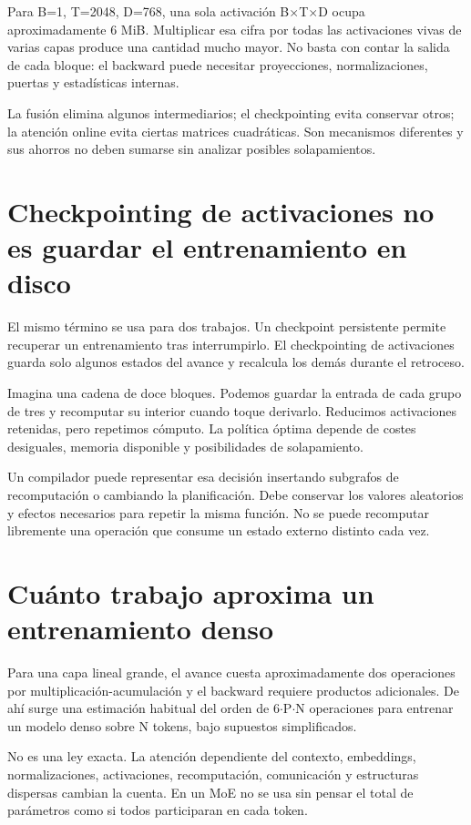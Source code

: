 \documentclass[12pt,a4paper,oneside]{report}
\begin{document}
Para B=1, T=2048, D=768, una sola activación B\ensuremath{\times}T\ensuremath{\times}D ocupa aproximadamente 6 MiB. Multiplicar esa cifra por todas las activaciones vivas de varias capas produce una cantidad mucho mayor. No basta con contar la salida de cada bloque: el backward puede necesitar proyecciones, normalizaciones, puertas y estadísticas internas.

La fusión elimina algunos intermediarios; el checkpointing evita conservar otros; la atención online evita ciertas matrices cuadráticas. Son mecanismos diferentes y sus ahorros no deben sumarse sin analizar posibles solapamientos.

\section{Checkpointing de activaciones no es guardar el entrenamiento en disco}
El mismo término se usa para dos trabajos. Un checkpoint persistente permite recuperar un entrenamiento tras interrumpirlo. El checkpointing de activaciones guarda solo algunos estados del avance y recalcula los demás durante el retroceso.

Imagina una cadena de doce bloques. Podemos guardar la entrada de cada grupo de tres y recomputar su interior cuando toque derivarlo. Reducimos activaciones retenidas, pero repetimos cómputo. La política óptima depende de costes desiguales, memoria disponible y posibilidades de solapamiento.

Un compilador puede representar esa decisión insertando subgrafos de recomputación o cambiando la planificación. Debe conservar los valores aleatorios y efectos necesarios para repetir la misma función. No se puede recomputar libremente una operación que consume un estado externo distinto cada vez.

\section{Cuánto trabajo aproxima un entrenamiento denso}
Para una capa lineal grande, el avance cuesta aproximadamente dos operaciones por multiplicación-acumulación y el backward requiere productos adicionales. De ahí surge una estimación habitual del orden de 6\ensuremath{\cdot}P\ensuremath{\cdot}N operaciones para entrenar un modelo denso sobre N tokens, bajo supuestos simplificados.

No es una ley exacta. La atención dependiente del contexto, embeddings, normalizaciones, activaciones, recomputación, comunicación y estructuras dispersas cambian la cuenta. En un MoE no se usa sin pensar el total de parámetros como si todos participaran en cada token.
\end{document}
